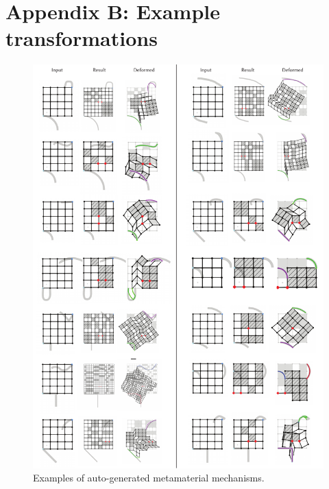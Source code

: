 \section{Appendix B: Example transformations}
\label{appendix:example-transformations}
\begin{figure} [h!]
    \includegraphics[width=\textwidth]{chapters/understanding-metamaterial-mechanisms-FIG/21-optimization-results.pdf}
    \caption[Short figure name.]{Examples of auto-generated metamaterial mechanisms.
    \label{fig:21-optimization-results}}
\end{figure}


